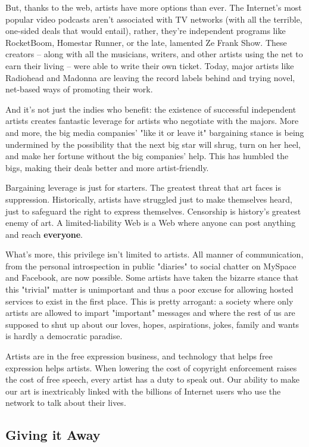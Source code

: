 But, thanks to the web, artists have more options than ever. The
Internet's most popular video podcasts aren't associated with TV
networks (with all the terrible, one-sided deals that would
entail), rather, they're independent programs like RocketBoom,
Homestar Runner, or the late, lamented Ze Frank Show. These
creators -- along with all the musicians, writers, and other
artists using the net to earn their living -- were able to write
their own ticket. Today, major artists like Radiohead and Madonna
are leaving the record labels behind and trying novel, net-based
ways of promoting their work.

And it's not just the indies who benefit: the existence of
successful independent artists creates fantastic leverage for
artists who negotiate with the majors. More and more, the big media
companies' "like it or leave it" bargaining stance is being
undermined by the possibility that the next big star will shrug,
turn on her heel, and make her fortune without the big companies'
help. This has humbled the bigs, making their deals better and more
artist-friendly.

Bargaining leverage is just for starters. The greatest threat that
art faces is suppression. Historically, artists have struggled just
to make themselves heard, just to safeguard the right to express
themselves. Censorship is history's greatest enemy of art. A
limited-liability Web is a Web where anyone can post anything and
reach \textbf{everyone}.

What's more, this privilege isn't limited to artists. All manner of
communication, from the personal introspection in public "diaries"
to social chatter on MySpace and Facebook, are now possible. Some
artists have taken the bizarre stance that this "trivial" matter is
unimportant and thus a poor excuse for allowing hosted services to
exist in the first place. This is pretty arrogant: a society where
only artists are allowed to impart "important" messages and where
the rest of us are supposed to shut up about our loves, hopes,
aspirations, jokes, family and wants is hardly a democratic
paradise.

Artists are in the free expression business, and technology that
helps free expression helps artists. When lowering the cost of
copyright enforcement raises the cost of free speech, every artist
has a duty to speak out. Our ability to make our art is
inextricably linked with the billions of Internet users who use the
network to talk about their lives.

\subsection{Giving it Away}

